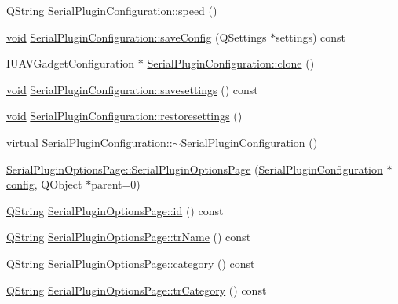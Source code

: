 \begin{DoxyCompactItemize}
\item 
\hyperlink{group___u_a_v_objects_plugin_gab9d252f49c333c94a72f97ce3105a32d}{Q\-String} \hyperlink{group___serial_plugin_ga1e6623a11c7e9c8e52411d2568dd4e7c}{Serial\-Plugin\-Configuration\-::speed} ()
\item 
\hyperlink{group___u_a_v_objects_plugin_ga444cf2ff3f0ecbe028adce838d373f5c}{void} \hyperlink{group___serial_plugin_ga01715638b8bff47aaa76961d1cd11f59}{Serial\-Plugin\-Configuration\-::save\-Config} (Q\-Settings $\ast$settings) const 
\item 
I\-U\-A\-V\-Gadget\-Configuration $\ast$ \hyperlink{group___serial_plugin_ga894fb8aa5280cdfb94f844d09f21e64d}{Serial\-Plugin\-Configuration\-::clone} ()
\item 
\hyperlink{group___u_a_v_objects_plugin_ga444cf2ff3f0ecbe028adce838d373f5c}{void} \hyperlink{group___serial_plugin_ga4a63c76785f20677382b69b52b9537f0}{Serial\-Plugin\-Configuration\-::savesettings} () const 
\item 
\hyperlink{group___u_a_v_objects_plugin_ga444cf2ff3f0ecbe028adce838d373f5c}{void} \hyperlink{group___serial_plugin_ga9c071c1ab20bf2139e54c469ab804332}{Serial\-Plugin\-Configuration\-::restoresettings} ()
\item 
virtual \hyperlink{group___serial_plugin_ga02088820254dad5d594d652f0d1ac556}{Serial\-Plugin\-Configuration\-::$\sim$\-Serial\-Plugin\-Configuration} ()
\item 
\hyperlink{group___serial_plugin_gabbba5e225f4b24b0ff2762edd89a7c85}{Serial\-Plugin\-Options\-Page\-::\-Serial\-Plugin\-Options\-Page} (\hyperlink{class_serial_plugin_configuration}{Serial\-Plugin\-Configuration} $\ast$\hyperlink{deflate_8c_a4473b5227787415097004fd39f55185e}{config}, Q\-Object $\ast$parent=0)
\item 
\hyperlink{group___u_a_v_objects_plugin_gab9d252f49c333c94a72f97ce3105a32d}{Q\-String} \hyperlink{group___serial_plugin_gaadfb80c5939566ed536ef5e6d49601fd}{Serial\-Plugin\-Options\-Page\-::id} () const 
\item 
\hyperlink{group___u_a_v_objects_plugin_gab9d252f49c333c94a72f97ce3105a32d}{Q\-String} \hyperlink{group___serial_plugin_ga6558090ef30ec926b500dc27787f194a}{Serial\-Plugin\-Options\-Page\-::tr\-Name} () const 
\item 
\hyperlink{group___u_a_v_objects_plugin_gab9d252f49c333c94a72f97ce3105a32d}{Q\-String} \hyperlink{group___serial_plugin_ga11d58b7fe11ee48ac5a865eaea4d9a13}{Serial\-Plugin\-Options\-Page\-::category} () const 
\item 
\hyperlink{group___u_a_v_objects_plugin_gab9d252f49c333c94a72f97ce3105a32d}{Q\-String} \hyperlink{group___serial_plugin_ga65036a91c24758081e8a2cecc44925a0}{Serial\-Plugin\-Options\-Page\-::tr\-Category} () const 

\end{DoxyCompactItemize}
